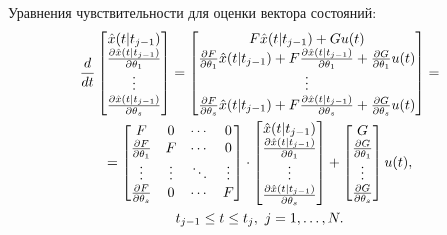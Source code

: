 \documentclass[a4paper,14pt]{extarticle}
\begin{document}
Уравнения чувствительности для оценки вектора состояний:
\begin{multline}
\label{eq:senstate}
\frac{d}{dt}
\begin{bmatrix}
	\hat{x}(t|t_{j-1}) \\
	\frac{\partial \hat{x}(t|t_{j-1})}{\partial \theta_1} \\
	\vdots \\
	\frac{\partial \hat{x}(t|t_{j-1})}{\partial \theta_s}
\end{bmatrix} =
\begin{bmatrix}
	F \hat{x}(t|t_{j-1}) + G u(t) \\
	\frac{\partial F}{\partial \theta_1} \hat{x}(t|t_{j-1}) +
		F \frac{\partial \hat{x}(t|t_{j-1})}{\partial \theta_1} +
		\frac{\partial G}{\partial \theta_1} u(t) \\
	\vdots  \\
	\frac{\partial F}{\partial \theta_s} \hat{x}(t|t_{j-1}) +
		F \frac{\partial \hat{x}(t|t_{j-1})}{\partial \theta_s} +
		\frac{\partial G}{\partial \theta_s} u(t)
\end{bmatrix} = \\ =
\begin{bmatrix}
	F & 0 & \cdots & 0 \\
	\frac{\partial F}{\partial \theta_1} & F & \cdots & 0 \\
	\vdots & \vdots & \ddots & \vdots \\
	\frac{\partial F}{\partial \theta_s} & 0 & \cdots & F
\end{bmatrix} \cdot
\begin{bmatrix}
	\hat{x}(t|t_{j-1}) \\
	\frac{\partial \hat{x}(t|t_{j-1})}{\partial \theta_1} \\
	\vdots \\
	\frac{\partial \hat{x}(t|t_{j-1})}{\partial \theta_s} \\
\end{bmatrix} +
\begin{bmatrix}
	G \\
	\frac{\partial{G}}{\partial \theta_1} \\
	\vdots \\
	\frac{\partial{G}}{\partial \theta_s}
\end{bmatrix} u(t),\\
\hspace{\fill} t_{j-1} \le t \le t_j,\ j=1,\ldots,N. \hspace{\fill}
\end{multline}
\end{document}
